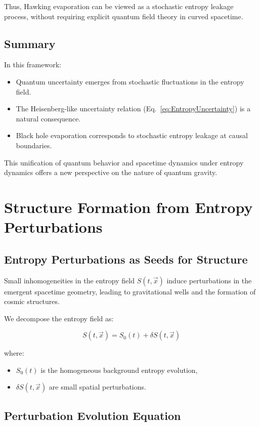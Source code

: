 \documentclass{article}
\begin{document}
Thus, Hawking evaporation can be viewed as a stochastic entropy leakage process, without requiring explicit quantum field theory in curved spacetime.

\subsection{Summary}

In this framework:
\begin{itemize}
    \item Quantum uncertainty emerges from stochastic fluctuations in the entropy field.
    \item The Heisenberg-like uncertainty relation (Eq.~\eqref{eq:EntropyUncertainty}) is a natural consequence.
    \item Black hole evaporation corresponds to stochastic entropy leakage at causal boundaries.
\end{itemize}

This unification of quantum behavior and spacetime dynamics under entropy dynamics offers a new perspective on the nature of quantum gravity.

\section{Structure Formation from Entropy Perturbations}

\subsection{Entropy Perturbations as Seeds for Structure}

Small inhomogeneities in the entropy field $S(t, \vec{x})$ induce perturbations in the emergent spacetime geometry, leading to gravitational wells and the formation of cosmic structures.

We decompose the entropy field as:

\begin{equation}
S(t, \vec{x}) = S_0(t) + \delta S(t, \vec{x})
\end{equation}

where:
\begin{itemize}
    \item $S_0(t)$ is the homogeneous background entropy evolution,
    \item $\delta S(t, \vec{x})$ are small spatial perturbations.
\end{itemize}

\subsection{Perturbation Evolution Equation}
\end{document}
